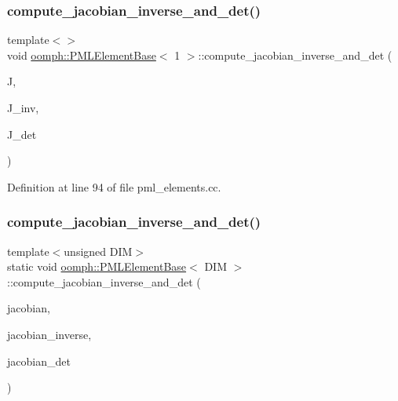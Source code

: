 \subsubsection{\texorpdfstring{compute\+\_\+jacobian\+\_\+inverse\+\_\+and\+\_\+det()}{compute\_jacobian\_inverse\_and\_det()}\hspace{0.1cm}{\footnotesize\ttfamily [1/4]}}
{\footnotesize\ttfamily template$<$$>$ \\
void \hyperlink{classoomph_1_1PMLElementBase}{oomph\+::\+P\+M\+L\+Element\+Base}$<$ 1 $>$\+::compute\+\_\+jacobian\+\_\+inverse\+\_\+and\+\_\+det (\begin{DoxyParamCaption}\item[{const \hyperlink{classoomph_1_1DiagonalComplexMatrix}{Diagonal\+Complex\+Matrix} \&}]{J,  }\item[{\hyperlink{classoomph_1_1DiagonalComplexMatrix}{Diagonal\+Complex\+Matrix} \&}]{J\+\_\+inv,  }\item[{std\+::complex$<$ double $>$ \&}]{J\+\_\+det }\end{DoxyParamCaption})}



Definition at line 94 of file pml\+\_\+elements.\+cc.

\mbox{\label{classoomph_1_1PMLElementBase_adb8311fd47392b0ccc1ed2e1c748ce41}} 
\subsubsection{\texorpdfstring{compute\+\_\+jacobian\+\_\+inverse\+\_\+and\+\_\+det()}{compute\_jacobian\_inverse\_and\_det()}\hspace{0.1cm}{\footnotesize\ttfamily [2/4]}}
{\footnotesize\ttfamily template$<$unsigned D\+IM$>$ \\
static void \hyperlink{classoomph_1_1PMLElementBase}{oomph\+::\+P\+M\+L\+Element\+Base}$<$ D\+IM $>$\+::compute\+\_\+jacobian\+\_\+inverse\+\_\+and\+\_\+det (\begin{DoxyParamCaption}\item[{const \hyperlink{classoomph_1_1DiagonalComplexMatrix}{Diagonal\+Complex\+Matrix} \&}]{jacobian,  }\item[{\hyperlink{classoomph_1_1DiagonalComplexMatrix}{Diagonal\+Complex\+Matrix} \&}]{jacobian\+\_\+inverse,  }\item[{std\+::complex$<$ double $>$ \&}]{jacobian\+\_\+det }\end{DoxyParamCaption})\hspace{0.3cm}{\ttfamily [static]}}



